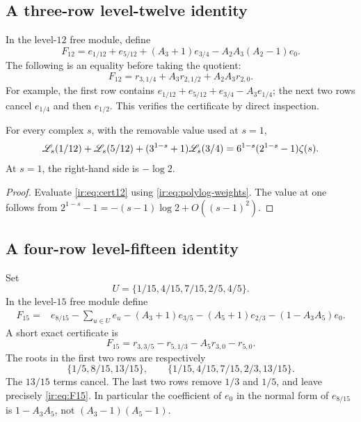 \subsection{A three-row level-twelve identity}
In the level-$12$ free module, define
\[
 F_{12}=e_{1/12}+e_{5/12}+(A_3+1)e_{3/4}
        -A_2A_3(A_2-1)e_0.
\]
The following is an equality before taking the quotient:
\begin{equation}\label{ir:eq:cert12}
 F_{12}=r_{3,1/4}+A_3r_{2,1/2}+A_2A_3r_{2,0}.
\end{equation}
For example, the first row contains
$e_{1/12}+e_{5/12}+e_{3/4}-A_3e_{1/4}$; the next two rows cancel
$e_{1/4}$ and then $e_{1/2}$. This verifies the certificate by direct
inspection.

\begin{corollary}\label{ir:cor:level12}
For every complex $s$, with the removable value used at $s=1$,
\begin{align}
 \mathscr L_{s}(1/12)+\mathscr L_{s}(5/12)
 +(3^{1-s}+1)\mathscr L_{s}(3/4)
 =6^{1-s}(2^{1-s}-1)\zeta(s).
 \label{ir:eq:level12}
\end{align}
At $s=1$, the right-hand side is $-\log2$.
\end{corollary}
\begin{proof}
Evaluate \eqref{ir:eq:cert12} using
\eqref{ir:eq:polylog-weights}. The value at one follows from
$2^{1-s}-1=-(s-1)\log2+O((s-1)^2)$.
\end{proof}

\subsection{A four-row level-fifteen identity}
Set
\begin{equation}\label{ir:eq:U-set}
 U=\{1/15,4/15,7/15,2/5,4/5\}.
\end{equation}
In the level-$15$ free module define
\begin{align}
 F_{15}={}&e_{8/15}-\sum_{u\in U}e_u
 -(A_3+1)e_{3/5}-(A_5+1)e_{2/3}
 -(1-A_3A_5)e_0.
 \label{ir:eq:F15}
\end{align}
A short exact certificate is
\begin{equation}\label{ir:eq:cert15}
 F_{15}=r_{3,3/5}-r_{5,1/3}-A_5r_{3,0}-r_{5,0}.
\end{equation}
The roots in the first two rows are respectively
\[
 \{1/5,8/15,13/15\},\qquad
 \{1/15,4/15,7/15,2/3,13/15\}.
\]
The $13/15$ terms cancel. The last two rows remove $1/3$ and
$1/5$, and leave precisely \eqref{ir:eq:F15}. In particular the
coefficient of $e_0$ in the normal form of $e_{8/15}$ is
$1-A_3A_5$, not $(A_3-1)(A_5-1)$.

